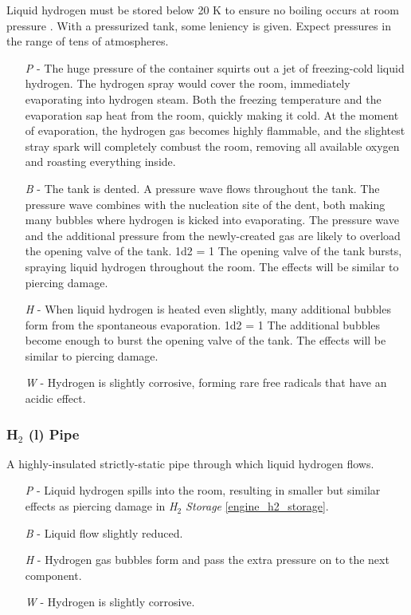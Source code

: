 \documentclass[a4paper]{article}
\begin{document}
Liquid hydrogen must be stored below 20 K to ensure no boiling occurs at room pressure \cite{international_temperature_scale_of_1968}. With a pressurized tank, some leniency is given. Expect pressures in the range of tens of atmospheres.
\begin{enumerate}
\item [\textit{P}] - The huge pressure of the container squirts out a jet of freezing-cold liquid hydrogen. The hydrogen spray would cover the room, immediately evaporating into hydrogen steam. Both the freezing temperature and the evaporation sap heat from the room, quickly making it cold. At the moment of evaporation, the hydrogen gas becomes highly flammable, and the slightest stray spark will completely combust the room, removing all available oxygen and roasting everything inside.
\item [\textit{B}] - The tank is dented. A pressure wave flows throughout the tank. The pressure wave combines with the nucleation site of the dent, both making many bubbles where hydrogen is kicked into evaporating. The pressure wave and the additional pressure from the newly-created gas are likely to overload the opening valve of the tank. \newline \hspace*{-3pt} 1d2 = 1 The opening valve of the tank bursts, spraying liquid hydrogen throughout the room. The effects will be similar to piercing damage.
\item [\textit{H}] - When liquid hydrogen is heated even slightly, many additional bubbles form from the spontaneous evaporation. \newline \hspace*{3pt} 1d2 = 1 The additional bubbles become enough to burst the opening valve of the tank. The effects will be similar to piercing damage.
\item [\textit{W}] - Hydrogen is slightly corrosive, forming rare free radicals that have an acidic effect.
\end{enumerate}

\vspace{-0.5cm} \hspace{-18pt} \subsubsection{H$_2$ (l) Pipe} \label{engine_h2_pipe} \vspace{-0.2cm}
A highly-insulated strictly-static pipe through which liquid hydrogen flows.
\begin{enumerate}
\item [\textit{P}] - Liquid hydrogen spills into the room, resulting in smaller but similar effects as piercing damage in \textit{H$_2$ Storage} \ref{engine_h2_storage}.
\item [\textit{B}] - Liquid flow slightly reduced.
\item [\textit{H}] - Hydrogen gas bubbles form and pass the extra pressure on to the next component.
\item [\textit{W}] - Hydrogen is slightly corrosive.
\end{enumerate}
\end{document}
